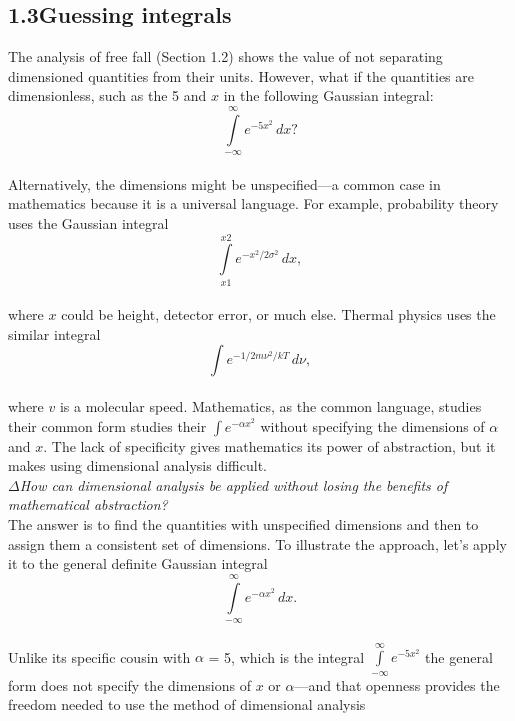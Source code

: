 \documentclass[a4paper]{article}
\numberwithin{equation}{section}
\begin{document}
\subsection*{1.3\quad Guessing integrals}
The analysis of free fall (Section 1.2) shows the value of not separating
dimensioned quantities from their units. However, what if the quantities
are dimensionless, such as the 5 and $x$ in the following Gaussian integral:
\\

\begin{equation}
\int\limits_{-\infty}^{\infty} e^{-5x^2}\,dx?
\end{equation}
\\
Alternatively, the dimensions might be unspecified—a common case in
mathematics because it is a universal language. For example, probability
theory uses the Gaussian integral
\\

\begin{equation}
\int\limits_{x1}^{x2} e^{-x^2/2\sigma^2}\,dx,
\end{equation}
\\
where $x$ could be height, detector error, or much else. Thermal physics
uses the similar integral
\\

\begin{equation}
\int e^{-1/2m\nu^2/kT}\,d\nu,
\end{equation}
\\
where $v$ is a molecular speed. Mathematics, as the common language,
studies their common form studies their $\int e^{-\alpha x^2}$ without specifying the dimensions of
$\alpha$ and $x$. The lack of specificity gives mathematics its power of abstraction,
but it makes using dimensional analysis difficult.
\\

$\Delta$\textit {How can dimensional analysis be applied without losing the benefits of mathematical
abstraction?}
\\

The answer is to find the quantities with unspecified dimensions and then
to assign them a consistent set of dimensions. To illustrate the approach,
let’s apply it to the general definite Gaussian integral
\\

\begin{equation}
\int\limits_{-\infty}^{\infty} e^{-\alpha x^2}\,dx.
\end{equation}
\\
Unlike its specific cousin with $\alpha$ = 5, which is the integral $\int\limits_{-\infty}^{\infty} e^{-5x^2}$ the general form does not specify the dimensions of $x$ or $\alpha$—and that
openness provides the freedom needed to use the method of dimensional
analysis
\\
\end{document}
